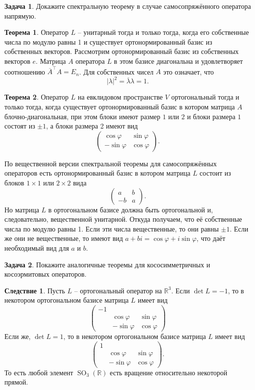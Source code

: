 \documentclass[10pt,a4paper,oneside]{book} %
\theoremstyle{definition}
\newtheorem{zad}{Задача}
\newtheorem{thm}{Теорема}
\newtheorem{cor}{Следствие}
\newcommand{\mb}[1]{\mathbb{#1}}
\newcommand{\ovl}{\overline}
\newcommand{\SO}{\operatorname{SO}}
\def\ffi{\varphi}
\def\thrm{\begin{thm}}
\def\ethrm{\end{thm}}
\def\zd{\begin{zad}}
\def\ezd{\end{zad}}
\def\crl{\begin{cor}}
\def\ecrl{\end{cor}}
\def\pmat{\begin{pmatrix}}
\def\epmat{\end{pmatrix}}
\begin{document}
\zd Докажите спектральную теорему в случае самосопряжённого оператора напрямую.
\ezd

\thrm Оператор $L$ -- унитарный тогда и только тогда, когда его собственные числа по модулю равны 1 и существует ортонормированный базис из собственных векторов. 
\proof Рассмотрим ортонормированный базис из собственных векторов $e$. Матрица $A$ оператора $L$ в этом базисе диагональна и удовлетворяет соотношению $\ovl{A}^{\top}A=E_n$. Для собственных чисел $A$ это означает, что $$|\lambda|^2=\ovl{\lambda}\lambda=1.$$ 
\endproof
\ethrm






\thrm Оператор $L$ на евклидовом пространстве $V$ ортогональный  тогда и только тогда, когда существует ортонормированный базис в котором матрица $A$ блочно-диагональная, при этом блоки имеют размер $1$ или $2$ и блоки размера $1$ состоят из $\pm 1$, а блоки размера 2 имеют вид
$$\begin{pmatrix}
\cos \varphi & \sin \varphi\\

-\sin \varphi &\cos \varphi
\end{pmatrix}.$$
\ethrm
\proof
По вещественной версии спектральной теоремы для самосопряжённых операторов есть ортонормированный базис в котором матрица $L$ состоит из блоков $1\times 1$ или $2\times 2$ вида 
$$\pmat a& b \\ -b & a \epmat.$$
Но матрица $L$ в ортогональном базисе должна быть ортогональной и, следовательно, вещественной унитарной. Откуда получаем, что её собственные числа по модулю равны 1. Если эти числа вещественные, то они равны $\pm 1$. Если же они не вещественные, то имеют вид $a+bi=\cos \ffi + i \sin \ffi$, что даёт необходимый вид для $a$ и $b$.
\endproof




\zd Покажите аналогичные теоремы для кососимметричных и косоэрмитовых операторов.
\ezd

\crl Пусть $L$ -- ортогональный оператор на $\mb R^3$. Если $\det L=-1$, то в некотором ортогональном базисе матрица $L$ имеет вид 
$$\begin{pmatrix}
- 1 &&\\
&\cos \varphi & \sin \varphi\\
&-\sin \varphi &\cos \varphi
\end{pmatrix}$$
Если же, $\det L=1$, то в некотором ортогональном базисе матрица $L$ имеет вид 
$$\begin{pmatrix}
1 &&\\
&\cos \varphi & \sin \varphi\\
&-\sin \varphi &\cos \varphi
\end{pmatrix}.$$
То есть любой элемент $\SO_3(\mb R)$ есть вращение относительно некоторой прямой. 
\ecrl
\end{document}
